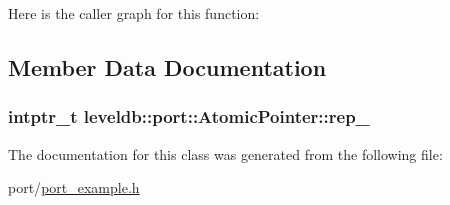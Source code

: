 Here is the caller graph for this function\-:




\subsection{Member Data Documentation}
\hypertarget{classleveldb_1_1port_1_1_atomic_pointer_a3403f113d32302b77d328e53c6bafcb5}{
\subsubsection[{rep\-\_\-}]{\setlength{\rightskip}{0pt plus 5cm}intptr\-\_\-t leveldb\-::port\-::\-Atomic\-Pointer\-::rep\-\_\-\hspace{0.3cm}{\ttfamily [private]}}}\label{classleveldb_1_1port_1_1_atomic_pointer_a3403f113d32302b77d328e53c6bafcb5}


The documentation for this class was generated from the following file\-:\begin{DoxyCompactItemize}
\item 
port/\hyperlink{port__example_8h}{port\-\_\-example.\-h}\end{DoxyCompactItemize}
